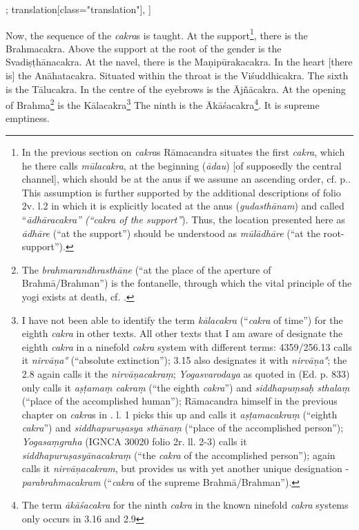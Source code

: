\begin{alignment}[
  texts=edition[class="edition"];
  translation[class="translation"],
  ]
\begin{translation}
\begin{tlate}[p29_01]
      Now, the sequence of the \textit{cakra}s is taught. At the support\footnote{In the previous section on \textit{cakra}s Rāmacandra situates the first \textit{cakra}, which he there calls \textit{mūlacakra}, at the beginning (\textit{ādau}) [of supposedly the central channel], which should be at the anus if we assume an ascending order, cf. p.\pageref{cakra1}. This assumption is further supported by the additional descriptions of  folio 2v. l.2 in which it is explicitly located at the anus (\textit{gudasthānam}) and called ``\textit{ādhāracakra'' (``\textit{cakra} of the support''}). Thus, the location presented here as \textit{ādhāre} (``at the support'') should be understood as \textit{mūlādhāre} (``at the root-support'').}, there is the Brahmacakra. Above the support at the root of the gender is the Svadiṣṭhānacakra. At the navel, there is the Maṇipūrakacakra. In the heart [there is] the Anāhatacakra. Situated within the throat is the Viśuddhicakra. The sixth is the Tālucakra. In the centre of the eyebrows is the Ājñācakra. At the opening of Brahma\footnote{The \textit{brahmarandhrasthāne} (``at the place of the aperture of Brahmā/Brahman'') is the fontanelle, through which the vital principle of the yogi exists at death, cf. \citeauthor[2017:438]{rootsofyoga2017}.} is the Kālacakra\footnote{I have not been able to identify the term \textit{kālacakra} (``\textit{cakra} of time'') for the eighth \textit{cakra} in other texts. All other texts that I am aware of designate the eighth \textit{cakra} in a ninefold \textit{cakra} system with different terms:  4359/256.13 calls it \textit{nirvāṇa°} (``absolute extinction'');  3.15 also designates it with \textit{nirvāṇa°}; the  2.8 again calls it the \textit{nirvāṇacakraṃ}; \textit{Yogasvarodaya} as quoted in  (Ed. p. 833) only calls it \textit{aṣṭamaṃ cakraṃ} (``the eighth \textit{cakra}'') and \textit{siddhapuṃsaḥ sthalaṃ} (``place of the accomplished human''); Rāmacandra himself in the previous chapter on \textit{cakra}s in . l. 1 picks this up and calls it \textit{aṣṭamacakraṃ} (``eighth \textit{cakra}'') and \textit{siddhapuruṣasya sthānaṃ} (``place of the accomplished person''); \textit{Yogasaṃgraha} (IGNCA 30020 folio 2r. ll. 2-3) calls it \textit{siddhapuruṣasyānacakraṃ} (``the \textit{cakra} of the accomplished person'');  again calls it \textit{nirvāṇacakram}, but provides us with yet another unique designation - \textit{parabrahmacakram} (``\textit{cakra} of the supreme Brahmā/Brahman'').} The ninth is the Ākāśacakra\footnote{The term \textit{ākāśacakra} for the ninth \textit{cakra} in the known ninefold \textit{cakra} systems only occurs in  3.16 and  2.9}. It is supreme emptiness.
      \flushpage
    \end{tlate}
  \end{translation}
\end{alignment}
